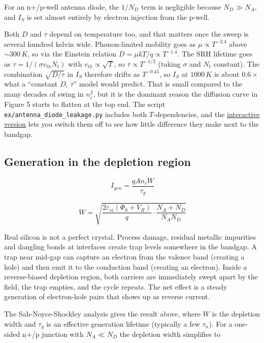For an n+/p-well antenna diode, the \(1/N_D\) term is negligible because
\(N_D \gg N_A\), and \(I_S\) is set almost entirely by electron
injection from the p-well.

Both \(D\) and \(\tau\) depend on temperature too, and that matters once
the sweep is several hundred kelvin wide. Phonon-limited mobility goes
as \(\mu \propto T^{-2.4}\) above \(\sim 300\, K\), so via the Einstein
relation \(D = \mu k T/q \propto T^{-1.4}\). The SRH lifetime goes as
\(\tau = 1/(\sigma v_{th} N_t)\) with \(v_{th} \propto
\sqrt{T}\), so \(\tau \propto T^{-1/2}\) (taking \(\sigma\) and \(N_t\)
constant). The combination \(\sqrt{D/\tau}\) in \(I_S\) therefore drifts
as \(T^{-0.45}\), so \(I_S\) at \(1000\, K\) is about \(0.6\times\) what
a ``constant \(D\), \(\tau\)'' model would predict. That is small
compared to the many decades of swing in \(n_i^2\), but it is the
dominant reason the diffusion curve in Figure 5 starts to flatten at the
top end. The script \texttt{ex/antenna\_diode\_leakage.py} includes both
\(T\)-dependencies, and the
\href{https://wulffern.github.io/aic2026/assets/examples/antenna-leakage.html}{interactive
version} lets you switch them off to see how little difference they make
next to the bandgap.

\subsection{Generation in the depletion
region}\label{generation-in-the-depletion-region}

\[ I_{gen} = \frac{q A n_i W}{\tau_g} \]

\[ W = \sqrt{\frac{2 \varepsilon_{si} (\Phi_0 + V_R)}{q} \cdot \frac{N_A + N_D}{N_A N_D}} \]

Real silicon is not a perfect crystal. Process damage, residual metallic
impurities and dangling bonds at interfaces create trap levels somewhere
in the bandgap. A trap near mid-gap can capture an electron from the
valence band (creating a hole) and then emit it to the conduction band
(creating an electron). Inside a reverse-biased depletion region, both
carriers are immediately swept apart by the field, the trap empties, and
the cycle repeats. The net effect is a steady generation of
electron-hole pairs that shows up as reverse current.

The Sah-Noyce-Shockley analysis gives the result above, where \(W\) is
the depletion width and \(\tau_g\) is an effective generation lifetime
(typically a few \(\tau_n\)). For a one-sided n+/p junction with
\(N_A \ll N_D\) the depletion width simplifies to

